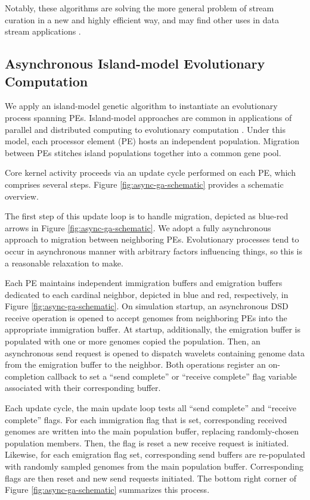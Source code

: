 Notably, these algorithms are solving the more general problem of stream curation in a new and highly efficient way, and may find other uses in data stream applications \citep{TODOCITEPREPRINT}.

\subsection{Asynchronous Island-model Evolutionary Computation}

We apply an island-model genetic algorithm to instantiate an evolutionary process spanning PEs.
Island-model approaches are common in applications of parallel and distributed computing to evolutionary computation \citep{bennett1999building}.
Under this model, each processor element (PE) hosts an independent population.
Migration between PEs stitches island populations together into a common gene pool.

Core kernel activity proceeds via an update cycle performed on each PE, which comprises several steps.
Figure \ref{fig:async-ga-schematic} provides a schematic overview.

The first step of this update loop is to handle migration, depicted as blue-red arrows in Figure \ref{fig:async-ga-schematic}.
We adopt a fully asynchronous approach to migration between neighboring PEs.
Evolutionary processes tend to occur in asynchronous manner with arbitrary factors influencing things, so this is a reasonable relaxation to make.

Each PE maintains independent immigration buffers and emigration buffers dedicated to each cardinal neighbor, depicted in blue and red, respectively, in Figure \ref{fig:async-ga-schematic}.
On simulation startup, an asynchronous DSD receive operation is opened to accept genomes from neighboring PEs into the appropriate immigration buffer.
At startup, additionally, the emigration buffer is populated with one or more genomes copied the population.
Then, an asynchronous send request is opened to dispatch wavelets containing genome data from the emigration buffer to the neighbor.
Both operations register an on-completion callback to set a ``send complete'' or ``receive complete'' flag variable associated with their corresponding buffer.

Each update cycle, the main update loop tests all ``send complete'' and ``receive complete'' flags.
For each immigration flag that is set, corresponding received genomes are written into the main population buffer, replacing randomly-chosen population members.
Then, the flag is reset a new receive request is initiated.
Likewise, for each emigration flag set, corresponding send buffers are re-populated with randomly sampled genomes from the main population buffer.
Corresponding flags are then reset and new send requests initiated.
The bottom right corner of Figure \ref{fig:async-ga-schematic} summarizes this process.

